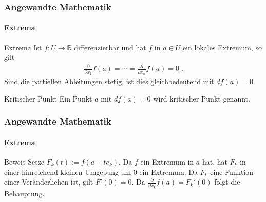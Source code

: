\documentclass{beamer}
\begin{document}
\begin{frame}
    \frametitle{Angewandte Mathematik}
\framesubtitle{Extrema}
    \begin{block}{Extrema}
 Ist $f: U  \to \mathbb{R}$ differenzierbar und hat  $f$ in $a \in U$ ein lokales Extremum, so gilt 
\begin{align*}
\frac{\partial}{\partial x_{1}} f(a) = \cdots  = \frac{\partial}{\partial x_{n}} f(a) = 0 \;.
\end{align*}
Sind die partiellen Ableitungen stetig, ist dies  gleichbedeutend mit $df(a) = 0$.
\end{block}
    \begin{block}{Kritischer Punkt}
 Ein Punkt $a$ mit $df(a) = 0$ wird kritischer Punkt genannt.
\end{block}

 \end{frame}

\begin{frame}
    \frametitle{Angewandte Mathematik}
\framesubtitle{Extrema}
    \begin{block}{Beweis}
Setze $F_k(t) := f(a + t e_k)$. Da $f$ ein Extremum in $a$ hat, hat $F_k$ in einer hinreichend kleinen Umgebung um $0$ ein Extremum. 
Da $F_k$ eine Funktion einer Veränderlichen ist, gilt $F'(0) = 0$. Da $\frac{\partial}{\partial x_k} f(a) = F_k'(0)$ folgt die Behauptung.
\end{block}
 \end{frame}
\end{document}
